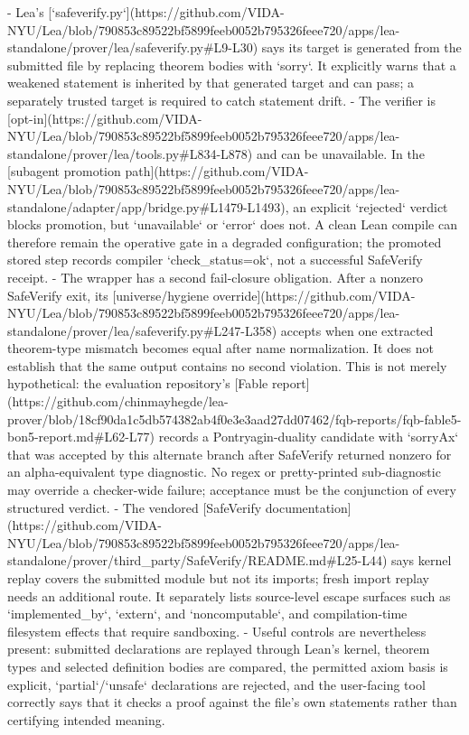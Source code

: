 \documentclass[11pt]{article}
\begin{document}
\begin{markdown}
- Lea's
  [`safeverify.py`](https://github.com/VIDA-NYU/Lea/blob/790853c89522bf5899feeb0052b795326feee720/apps/lea-standalone/prover/lea/safeverify.py#L9-L30)
  says its target is generated from the submitted file by replacing
  theorem bodies with `sorry`. It explicitly warns that a weakened statement is inherited by that
  generated target and can pass; a separately trusted target is required to catch statement drift.
- The verifier is
  [opt-in](https://github.com/VIDA-NYU/Lea/blob/790853c89522bf5899feeb0052b795326feee720/apps/lea-standalone/prover/lea/tools.py#L834-L878)
  and can be unavailable. In the
  [subagent promotion path](https://github.com/VIDA-NYU/Lea/blob/790853c89522bf5899feeb0052b795326feee720/apps/lea-standalone/adapter/app/bridge.py#L1479-L1493),
  an explicit
  `rejected` verdict blocks promotion, but `unavailable` or `error` does not. A clean Lean compile
  can therefore remain the operative gate in a degraded configuration; the promoted stored step
  records compiler `check_status=ok`, not a successful SafeVerify receipt.
- The wrapper has a second fail-closure obligation. After a nonzero SafeVerify exit, its
  [universe/hygiene override](https://github.com/VIDA-NYU/Lea/blob/790853c89522bf5899feeb0052b795326feee720/apps/lea-standalone/prover/lea/safeverify.py#L247-L358)
  accepts when one extracted theorem-type mismatch becomes equal after name normalization. It does
  not establish that the same output contains no second violation. This is not merely hypothetical:
  the evaluation repository's
  [Fable report](https://github.com/chinmayhegde/lea-prover/blob/18cf90da1c5db574382ab4f0e3e3aad27dd07462/fqb-reports/fqb-fable5-bon5-report.md#L62-L77)
  records a Pontryagin-duality candidate with `sorryAx` that was accepted by this alternate branch
  after SafeVerify returned nonzero for an alpha-equivalent type diagnostic. No regex or
  pretty-printed sub-diagnostic may override a checker-wide failure; acceptance must be the
  conjunction of every structured verdict.
- The vendored
  [SafeVerify documentation](https://github.com/VIDA-NYU/Lea/blob/790853c89522bf5899feeb0052b795326feee720/apps/lea-standalone/prover/third_party/SafeVerify/README.md#L25-L44)
  says kernel replay covers the submitted module but not its imports; fresh import replay needs an
  additional route. It separately lists source-level escape
  surfaces such as `implemented_by`, `extern`, and `noncomputable`, and compilation-time filesystem
  effects that require sandboxing.
- Useful controls are nevertheless present: submitted declarations are replayed through Lean's
  kernel, theorem types and selected definition bodies are compared, the permitted axiom basis is
  explicit, `partial`/`unsafe` declarations are rejected, and the user-facing tool correctly says
  that it checks a proof against the file's own statements rather than certifying intended meaning.


\end{markdown}
\end{document}
